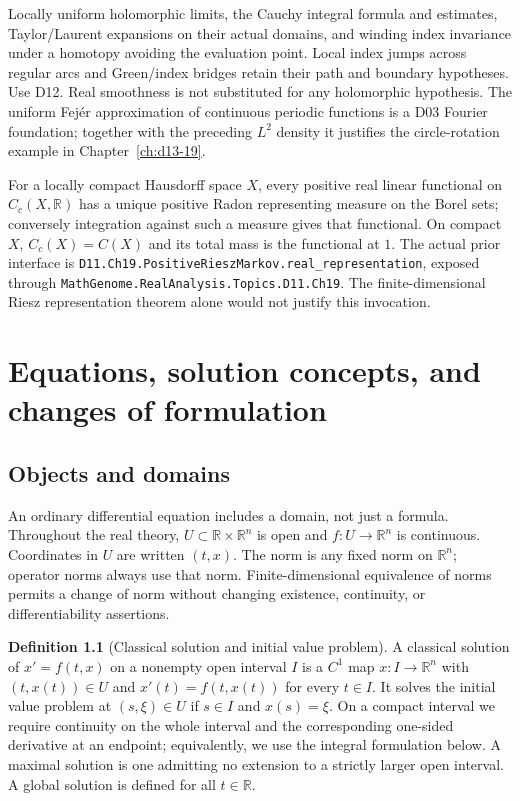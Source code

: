 \documentclass[11pt,oneside]{book}
\theoremstyle{definition}
\newtheorem{definition}[theorem]{Definition}
\theoremstyle{remark}\newtheorem{remark}[theorem]{Remark}
\newcommand{\R}{\mathbb R}\newcommand{\C}{\mathbb C}
\begin{document}
\begin{description}[style=nextline,leftmargin=11mm]
\item[F6. Complex analysis.]
Locally uniform holomorphic limits, the Cauchy integral formula and estimates,
Taylor/Laurent expansions on their actual domains, and winding index
invariance under a homotopy avoiding the evaluation point. Local index
jumps across regular arcs and Green/index bridges retain their path and
boundary hypotheses. Use D12. Real smoothness is not substituted for any
holomorphic hypothesis. The uniform Fej\'er approximation of continuous
periodic functions is a D03 Fourier foundation; together with the preceding
$L^2$ density it justifies the circle-rotation example in Chapter~\ref{ch:d13-19}.

\item[F7. Positive Riesz--Markov representation.]
For a locally compact Hausdorff space $X$, every positive real linear
functional on $C_c(X,\R)$ has a unique positive Radon representing measure
on the Borel sets; conversely integration against such a measure gives that
functional. On compact $X$, $C_c(X)=C(X)$ and its total mass is the functional
at $1$. The actual prior interface is
\texttt{D11.Ch19.PositiveRieszMarkov.real\_representation}, exposed through
\texttt{MathGenome.RealAnalysis.Topics.D11.Ch19}. The finite-dimensional
Riesz representation theorem alone would not justify this invocation.
\end{description}


\mainmatter

\chapter{Equations, solution concepts, and changes of formulation}\label{ch:d13-01}

\section{Objects and domains}
An ordinary differential equation includes a domain, not just a formula.
Throughout the real theory, $U\subset\R\times\R^n$ is open and
$f:U\to\R^n$ is continuous. Coordinates in $U$ are written $(t,x)$.
The norm is any fixed norm on $\R^n$; operator norms always use that norm.
Finite-dimensional equivalence of norms permits a change of norm without
changing existence, continuity, or differentiability assertions.

\begin{definition}[Classical solution and initial value problem]\label{d13:01:solution}
A classical solution of $x'=f(t,x)$ on a nonempty open interval $I$ is a
$C^1$ map $x:I\to\R^n$ with $(t,x(t))\in U$ and
$x'(t)=f(t,x(t))$ for every $t\in I$. It solves the initial value problem
at $(s,\xi)\in U$ if $s\in I$ and $x(s)=\xi$.
On a compact interval we require continuity on the whole interval and the
corresponding one-sided derivative at an endpoint; equivalently, we use the
integral formulation below. A maximal solution is one admitting no extension
to a strictly larger open interval. A global solution is defined for all
$t\in\R$.
\end{definition}
\end{document}
